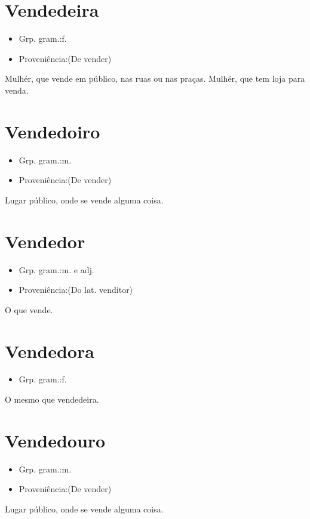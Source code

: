 \documentclass{article}
\begin{document}
\section{Vendedeira}
\begin{itemize}
\item {Grp. gram.:f.}
\end{itemize}
\begin{itemize}
\item {Proveniência:(De \textunderscore vender\textunderscore )}
\end{itemize}
Mulhér, que vende em público, nas ruas ou nas praças.
Mulhér, que tem loja para venda.
\section{Vendedoiro}
\begin{itemize}
\item {Grp. gram.:m.}
\end{itemize}
\begin{itemize}
\item {Proveniência:(De \textunderscore vender\textunderscore )}
\end{itemize}
Lugar público, onde se vende alguma coisa.
\section{Vendedor}
\begin{itemize}
\item {Grp. gram.:m.  e  adj.}
\end{itemize}
\begin{itemize}
\item {Proveniência:(Do lat. \textunderscore venditor\textunderscore )}
\end{itemize}
O que vende.
\section{Vendedora}
\begin{itemize}
\item {Grp. gram.:f.}
\end{itemize}
O mesmo que \textunderscore vendedeira\textunderscore .
\section{Vendedouro}
\begin{itemize}
\item {Grp. gram.:m.}
\end{itemize}
\begin{itemize}
\item {Proveniência:(De \textunderscore vender\textunderscore )}
\end{itemize}
Lugar público, onde se vende alguma coisa.
\end{document}
